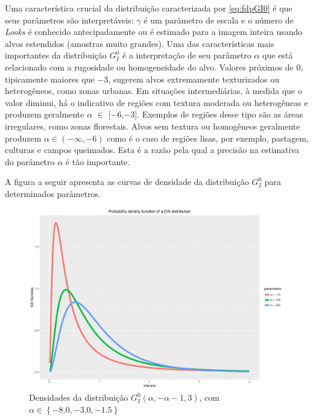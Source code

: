 Uma característica crucial da distribuição caracterizada por \eqref{eq:fdpGI0} é que seus parâmetros são interpretáveis: $\gamma$ é um parâmetro de escala e o número de \textit{Looks} é conhecido antecipadamente ou é estimado para a imagem inteira usando alvos estendidos (amostras muito grandes). Uma das características mais importantes da distribuição $G_I^0$ é a interpretação de seu parâmetro $\alpha$ que está relacionado com a rugosidade ou homogeneidade do alvo. Valores próximos de $0$, tipicamente maiores que $-3$, sugerem alvos extremamente texturizados ou heterogêneos, como zonas urbanas. Em situações intermediárias, à medida que o valor diminui, há o indicativo de regiões com textura moderada ou heterogêneas e produzem geralmente $\alpha$ $\in$ [$-6$,$-3$]. Exemplos de regiões desse tipo são as áreas irregulares, como zonas florestais. Alvos sem textura ou homogêneos geralmente produzem $\alpha \in (-\infty, -6)$ como é o caso de regiões lisas, por exemplo, pastagem, culturas e campos queimados. Esta é a razão pela qual a precisão na estimativa do parâmetro $\alpha$ é tão importante.

A figura a seguir apresenta as curvas de densidade da distribuição $G_I^0$ para determinados parâmetros.
\begin{figure}[H]
     \centering
     \includegraphics[scale=0.5]{plots/GI0Densities.pdf}
     \caption{Densidades da distribuição $G_I^0(\alpha, -\alpha - 1, 3)$, com $\alpha \in \left \{  -8.0, -3.0, -1.5 \right \}$}
     \label{graf_1}
\end{figure}

